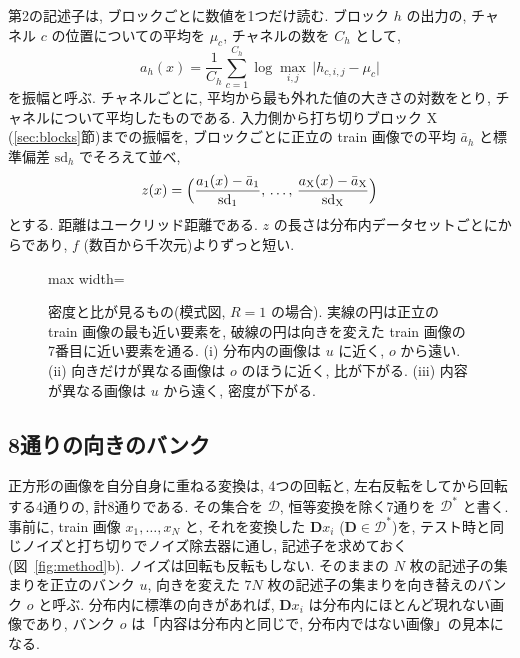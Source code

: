 \documentclass[MIRU,submit]{miru2025j}
\newcommand{\Dm}{\mathbf{D}}            %
\begin{document}
第2の記述子は, ブロックごとに数値を1つだけ読む. ブロック $h$ の出力の, チャネル $c$ の位置についての平均を $\mu_c$, チャネルの数を $C_h$ として,
\begin{equation}
a_h(x)=\frac{1}{C_h}\sum_{c=1}^{C_h}\log\max_{i,j}\,\bigl|h_{c,i,j}-\mu_c\bigr|
\label{eq:amp}
\end{equation}
を振幅と呼ぶ. チャネルごとに, 平均から最も外れた値の大きさの対数をとり, チャネルについて平均したものである. 入力側から打ち切りブロック X (\ref{sec:blocks}節)までの振幅を, ブロックごとに正立の train 画像での平均 $\bar{a}_h$ と標準偏差 $\mathrm{sd}_h$ でそろえて並べ,
\begin{equation}
z(x)=\Bigl(\frac{a_1(x)-\bar{a}_1}{\mathrm{sd}_1},\,\ldots,\,\frac{a_{\mathrm{X}}(x)-\bar{a}_{\mathrm{X}}}{\mathrm{sd}_{\mathrm{X}}}\Bigr)
\label{eq:z}
\end{equation}
とする. 距離はユークリッド距離である. $z$ の長さは分布内データセットごとに\nNzMin{}から\nNzMax{}であり, $f$ (数百から千次元)よりずっと短い.

\begin{figure}[t]\centering
\begin{adjustbox}{max width=\columnwidth}\end{adjustbox}
\caption{密度と比が見るもの(模式図, $R=1$ の場合). 実線の円は正立の train 画像の最も近い要素を, 破線の円は向きを変えた train 画像の7番目に近い要素を通る. (i) 分布内の画像は $u$ に近く, $o$ から遠い. (ii) 向きだけが異なる画像は $o$ のほうに近く, 比が下がる. (iii) 内容が異なる画像は $u$ から遠く, 密度が下がる.}
\label{fig:idea}
\end{figure}

\subsection{8通りの向きのバンク}
正方形の画像を自分自身に重ねる変換は, 4つの回転と, 左右反転をしてから回転する4通りの, 計8通りである. その集合を $\mathcal{D}$, 恒等変換を除く7通りを $\mathcal{D}^{*}$ と書く. 事前に, train 画像 $x_1,\ldots,x_N$ と, それを変換した $\Dm x_i$ ($\Dm\in\mathcal{D}^{*}$)を, テスト時と同じノイズと打ち切りでノイズ除去器に通し, 記述子を求めておく(図~\ref{fig:method}b). ノイズは回転も反転もしない. そのままの $N$ 枚の記述子の集まりを正立のバンク $u$, 向きを変えた $7N$ 枚の記述子の集まりを向き替えのバンク $o$ と呼ぶ. 分布内に標準の向きがあれば, $\Dm x_i$ は分布内にほとんど現れない画像であり, バンク $o$ は「内容は分布内と同じで, 分布内ではない画像」の見本になる.
\end{document}
